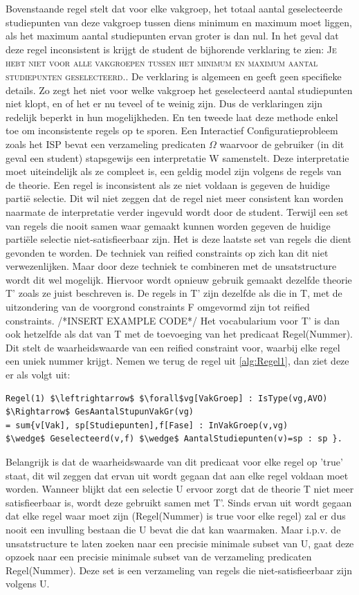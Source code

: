 Bovenstaande regel stelt dat voor elke vakgroep, het totaal aantal geselecteerde studiepunten van deze vakgroep tussen diens minimum en maximum moet liggen, als het maximum aantal studiepunten ervan groter is dan nul. In het geval dat deze regel inconsistent is krijgt de student de bijhorende verklaring te zien: \textsc{Je hebt niet voor alle vakgroepen tussen het minimum en maximum aantal studiepunten geselecteerd.}. De verklaring is algemeen en geeft geen specifieke details. Zo zegt het niet voor welke vakgroep het geselecteerd aantal studiepunten niet klopt, en of het er nu teveel of te weinig zijn. Dus de verklaringen zijn redelijk beperkt in hun mogelijkheden. En ten tweede laat deze methode enkel toe om inconsistente regels op te sporen. Een Interactief Configuratieprobleem zoals het ISP bevat een verzameling predicaten $\Omega$ waarvoor de gebruiker (in dit geval een student) stapsgewijs een interpretatie W samenstelt. Deze interpretatie moet uiteindelijk als ze compleet is, een geldig model zijn volgens de regels van de theorie. Een regel is inconsistent als ze niet voldaan is gegeven de huidige parti\"{e} selectie. Dit wil niet zeggen dat de regel niet meer consistent kan worden naarmate de interpretatie verder ingevuld wordt door de student. Terwijl een set van regels die nooit samen waar gemaakt kunnen worden gegeven de huidige parti\"{e}le selectie niet-satisfieerbaar zijn. Het is deze laatste set van regels die dient gevonden te worden. De techniek van reified constraints op zich kan dit niet verwezenlijken. Maar door deze techniek te combineren met de unsatstructure wordt dit wel mogelijk. Hiervoor wordt opnieuw gebruik gemaakt dezelfde theorie T' zoals ze juist beschreven is. De regels in T' zijn dezelfde als die in T, met de uitzondering van de voorgrond constraints F omgevormd zijn tot reified constraints. 
/*INSERT EXAMPLE CODE*/
Het vocabularium voor T' is dan ook hetzelfde als dat van T met de toevoeging van het predicaat Regel(Nummer). Dit stelt de waarheidswaarde van een reified constraint voor, waarbij elke regel een uniek nummer krijgt. Nemen we terug de regel uit \ref{alg:Regel1}, dan ziet deze er als volgt uit: 
\lstset{basicstyle=\scriptsize}
\begin{lstlisting}[mathescape, caption=IDP Reified Constraint Example 2, frame=single]
Regel(1) $\leftrightarrow$ $\forall$vg[VakGroep] : IsType(vg,AVO) $\Rightarrow$ GesAantalStupunVakGr(vg) 
= sum{v[Vak], sp[Studiepunten],f[Fase] : InVakGroep(v,vg) 
$\wedge$ Geselecteerd(v,f) $\wedge$ AantalStudiepunten(v)=sp : sp }.
\end{lstlisting}
Belangrijk is dat de waarheidswaarde van dit predicaat voor elke regel op 'true' staat, dit wil zeggen dat ervan uit wordt gegaan dat aan elke regel voldaan moet worden. Wanneer blijkt dat een selectie U ervoor zorgt dat de theorie T niet meer satisfieerbaar is, wordt deze gebruikt samen met T'. Sinds ervan uit wordt gegaan dat elke regel waar moet zijn (Regel(Nummer) is true voor elke regel) zal er dus nooit een invulling bestaan die U bevat die dat kan waarmaken. Maar i.p.v. de unsatstructure te laten zoeken naar een precisie minimale subset van U, gaat deze opzoek naar een precisie minimale subset van de verzameling predicaten Regel(Nummer). Deze set is een verzameling van regels die niet-satisfieerbaar zijn volgens U.

